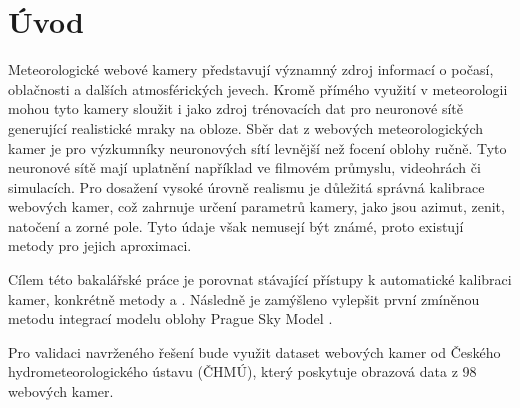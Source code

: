 \chapter*{Úvod}

Meteorologické webové kamery představují významný zdroj informací o počasí, oblačnosti a dalších atmosférických jevech. 
Kromě přímého využití v meteorologii mohou tyto kamery sloužit i jako zdroj trénovacích dat pro neuronové sítě generující realistické mraky na obloze. 
Sběr dat z webových meteorologických kamer je pro výzkumníky neuronových sítí levnější než focení oblohy ručně.
Tyto neuronové sítě mají uplatnění například ve filmovém průmyslu, videohrách či simulacích. 
Pro dosažení vysoké úrovně realismu je důležitá správná kalibrace webových kamer, což zahrnuje určení parametrů kamery, jako jsou azimut, zenit, natočení a zorné pole. Tyto údaje však nemusejí být známé, proto existují metody pro jejich aproximaci.

Cílem této bakalářské práce je porovnat stávající přístupy k automatické kalibraci kamer, konkrétně metody \cite{Lalonde10} a \cite{deepcalib}. Následně je zamýšleno vylepšit první zmíněnou metodu integrací modelu oblohy Prague Sky Model \citep{Prague2021}.

Pro validaci navrženého řešení  bude využit dataset webových kamer od Českého hydrometeorologického ústavu (ČHMÚ), který poskytuje obrazová data z 98 webových kamer.